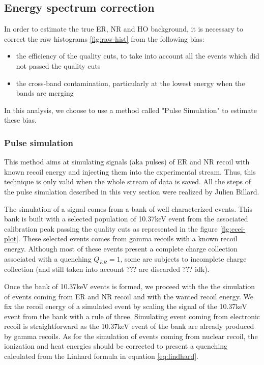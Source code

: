 \subsection{Energy spectrum correction}

In order to estimate the true ER, NR and HO background, it is necessary to correct the raw histograms \ref{fig:raw-hist} from the following bias:
\begin{itemize}
	\item the efficiency of the quality cuts, to take into account all the events which did not passed the quality cuts
	\item the cross-band contamination, particularly at the lowest energy when the bands are merging
\end{itemize}
In this analysis, we choose to use a method called "Pulse Simulation" to estimate these bias.


\subsubsection{Pulse simulation}
\label{par:pulse-simulation}

This method aims at simulating signals (aka pulses) of ER and NR recoil with known recoil energy and injecting them into the experimental stream. Thus, this technique is only valid when the whole stream of data is saved. All the steps of the pulse simulation described in this very section were realized by Julien Billard.

The simulation of a signal comes from a bank of well characterized events. This bank is built with a selected population of 10.37keV event from the associated calibration peak passing the quality cuts as represented in the figure \ref{fig:ecei-plot}. These selected events comes from gamma recoils with a known recoil energy. Although most of these events present a complete charge collection associated with a quenching $Q_{ER}=1$, some are subjects to incomplete charge collection (and still taken into account ??? are discarded ??? idk).

Once the bank of 10.37keV events is formed, we proceed with the the simulation of events coming from ER and NR recoil and with the wanted recoil energy. We fix the recoil energy of a simulated event by scaling the signal of the 10.37keV event from the bank with a rule of three. Simulating event coming from electronic recoil is straightforward as the 10.37keV event of the bank are already produced by gamma recoils. As for the simulation of events coming from nuclear recoil, the ionization and heat energies should be corrected to present a quenching calculated from the Linhard formula in equation \ref{eq:lindhard}.

